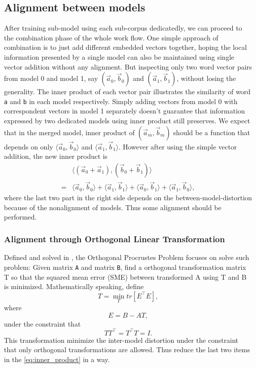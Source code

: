   \subsection{Alignment between models}
  After training sub-model using each sub-corpus dedicatedly, we can proceed to the combination phase of the whole work flow. One simple approach of combination is to just add different embedded vectors together, hoping the local information presented by a single model can also be maintained using single vector addition without any alignment. But inspecting only two word vector pairs from model 0 and model 1, say $(\vec{a}_0, \vec{b}_0)$ and $(\vec{a}_1, \vec{b}_1)$, without losing the generality. The inner product of each vector pair illustrates the similarity of word \verb|a| and \verb|b| in each model respectively. Simply adding vectors from model 0 with correspondent vectors in model 1 separately doesn't guarantee that information expressed by two dedicated models using inner product still preserves. We expect that in the merged model, inner product of $(\vec{a}_m,\vec{b}_m)$ should be a function that depends on only $\langle\vec{a}_0,\vec{b}_0\rangle$ and $\langle\vec{a}_1, \vec{b}_1\rangle$. However after using the simple vector addition, the new inner product is
  \begin{equation}\label{eq:inner_product}
  \begin{split}
  &\langle(\vec{a}_0+\vec{a}_1), (\vec{b}_0+\vec{b}_1)\rangle\\
  = &\langle\vec{a}_0,\vec{b}_0\rangle+
    \langle\vec{a}_1,\vec{b}_1\rangle+
    \langle\vec{a}_0,\vec{b}_1\rangle+
    \langle\vec{a}_1,\vec{b}_0\rangle,
  \end{split}
  \end{equation}
  where the last two part in the right side depends on the between-model-distortion because of the nonalignment of models. Thus some alignment should be performed.

  \subsubsection{Alignment through Orthogonal Linear Transformation}
  Defined and solved in \cite{schonemann1966generalized}, the Orthogonal Procrustes Problem focuses on solve such problem: Given matrix \verb|A| and matrix \verb|B|, find a orthogonal transformation matrix T so that the squared mean error (SME) between transformed A using T and B is minimized. Mathematically speaking, define
  \begin{equation}
  T = \min_{T}tr[E^\intercal E],
  \end{equation}
  where 
  \begin{equation}
  E=B-AT,
  \end{equation}
  under the constraint that 
  \begin{equation}
  TT^\intercal=T^\intercal T=I.
  \end{equation}
  This transformation minimize the inter-model distortion under the constraint that only orthogonal transformations are allowed. Thus reduce the last two items in the \eqref{eq:inner_product} in a way.

